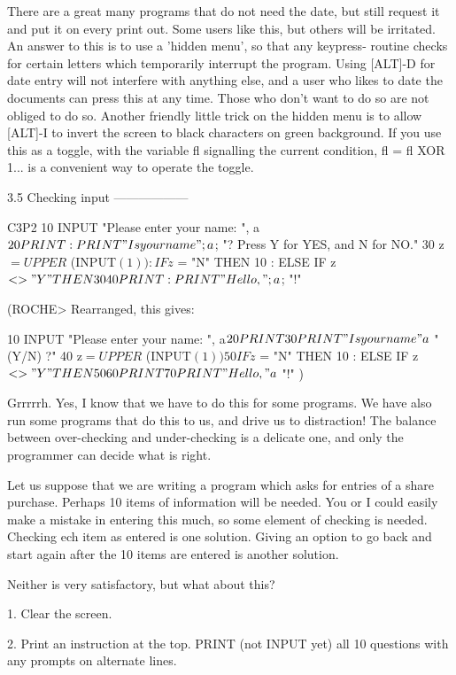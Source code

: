 There  are a great many programs that do not need the date, but still  request 
it  and  put it on every print out. Some users like this, but others  will  be 
irritated. An answer to this is to use a 'hidden menu', so that any  keypress-
routine  checks for certain letters which temporarily interrupt  the  program. 
Using [ALT]-D for date entry will not interfere with anything else, and a user 
who  likes to date the documents can press this at any time. Those  who  don't 
want  to do so are not obliged to do so. Another friendly little trick on  the 
hidden  menu is to allow [ALT]-I to invert the screen to black  characters  on 
green background. If you use this as a toggle, with the variable fl signalling 
the  current  condition, fl = fl XOR 1... is a convenient way to  operate  the 
toggle.


3.5 Checking input
------------------

        C3P2
        10 INPUT "Please enter your name: ", a$
        20  PRINT : PRINT "Is your name "; a$; "? Press Y for YES, and  N  for 
NO."
        30 z$ = UPPER$ (INPUT$ (1)) : IF z$ = "N" THEN 10 : ELSE IF z$ <>  "Y" 
THEN 30
        40 PRINT : PRINT "Hello, "; a$; "!"

(ROCHE> Rearranged, this gives:

        10 INPUT "Please enter your name: ", a$
        20 PRINT
        30 PRINT "Is your name " a$ " (Y/N) ?"
        40 z$ = UPPER$ (INPUT$ (1))
        50 IF z$ = "N" THEN 10 : ELSE IF z$ <> "Y" THEN 50
        60 PRINT
        70 PRINT "Hello, " a$ "!"
)

Grrrrrh.  Yes, I know that we have to do this for some programs. We have  also 
run some programs that do this to us, and drive us to distraction! The balance 
between  over-checking  and  under-checking is a delicate one,  and  only  the 
programmer can decide what is right.

Let us suppose that we are writing a program which asks for entries of a share 
purchase.  Perhaps  10  items of information will be needed. You  or  I  could 
easily  make a mistake in entering this much, so some element of  checking  is 
needed.  Checking ech item as entered is one solution. Giving an option to  go 
back and start again after the 10 items are entered is another solution.

Neither is very satisfactory, but what about this?

     1. Clear the screen.

     2.  Print  an  instruction  at the top. PRINT  (not  INPUT  yet)  all  10 
questions with any prompts on alternate lines.


